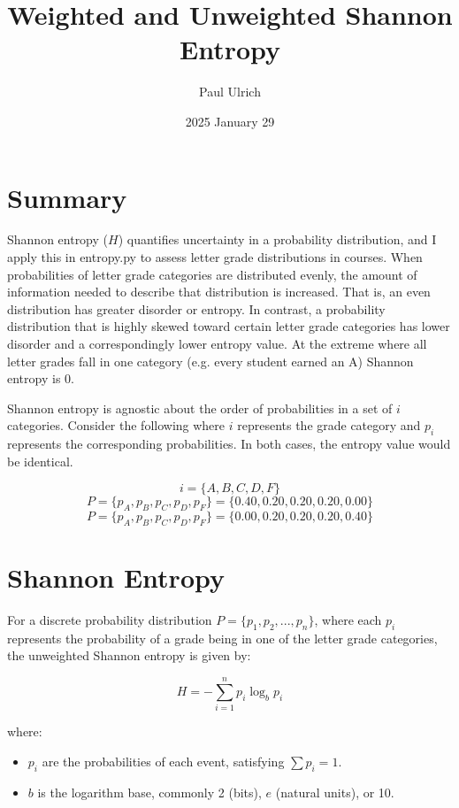 \documentclass{article}
\begin{document}
\title{Weighted and Unweighted Shannon Entropy}
\author{Paul Ulrich}
\date{2025 January 29}
\maketitle


\section{Summary}

Shannon entropy (\(H\)) quantifies  uncertainty in a probability distribution, and I apply this in entropy.py to assess letter grade distributions in courses. When probabilities of letter grade categories are distributed evenly, the amount of information needed to describe that distribution is increased. That is, an even distribution has greater disorder or entropy. In contrast, a probability distribution that is highly skewed toward certain letter grade categories has lower disorder and a correspondingly lower entropy value. At the extreme where all letter grades fall in one category (e.g. every student earned an A) Shannon entropy is 0.

Shannon entropy is agnostic about the order of probabilities in a set of \( i \) categories. Consider the following where \( i \) represents the grade category and \( p_i \) represents the corresponding probabilities. In both cases, the entropy value would be identical.

\[
i = \{A, B, C, D, F\}
\]
\[
P = \{ p_A, p_B, p_C, p_D, p_F \} = \{0.40, 0.20, 0.20, 0.20, 0.00\}
\]
\[
P = \{ p_A, p_B, p_C, p_D, p_F \} = \{0.00, 0.20, 0.20, 0.20, 0.40\}
\]

\section{Shannon Entropy}
For a discrete probability distribution
\( P = \{p_1, p_2, ..., p_n\} \), where each \( p_i \) represents the probability of a grade being in one of the letter grade categories, the unweighted Shannon entropy is given by:

\begin{equation}
H = - \sum_{i=1}^{n} p_i \log_b p_i
\end{equation}

where:
\begin{itemize}
    \item \( p_i \) are the probabilities of each event, satisfying \( \sum p_i = 1 \).
    \item \( b \) is the logarithm base, commonly 2 (bits), \( e \) (natural units), or 10.
\end{itemize}
\end{document}
